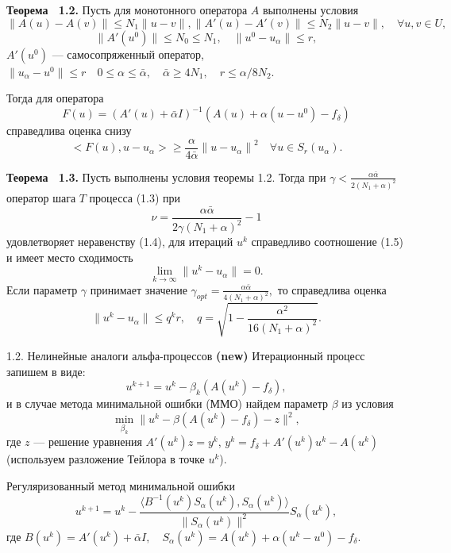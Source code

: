 \documentclass[10pt,pdf, mathserif, hyperref={unicode}]{beamer}
\begin{document}
\begin{frame}
	\begin{block}{\bf Теорема ~1.2.}
		Пусть для монотонного оператора $A$ выполнены условия $$
		\|A(u)-A(v)\|\le N_1\|u-v\|,
		\|A'(u)-A'(v)\|\le N_2\|u-v\|, \quad \forall u, v \in U,$$
		$$\|A'(u^0)\| \le N_0\le N_1, \quad \|u^0-u_\alpha\| \le r, $$
		\smallskip
		$A'(u^0)$ --- самосопряженный оператор, $\|u_\alpha-u^0\|\le r \quad  
		0\le\alpha\le\bar\alpha,\quad\bar\alpha\ge 4N_1,\quad r\le\alpha/8N_2.$
		\vspace{3mm}
		
		Тогда для оператора
		$$ F(u)=(A'(u)+\bar\alpha I)^{-1}(A(u)+\alpha(u-u^0)-f_\delta) $$
		справедлива оценка снизу
		$$<F(u), u-u_\alpha>\ge\frac{\alpha}{4\bar\alpha}{\|u-u_\alpha\|}^2 \quad \forall u \in S_r(u_\alpha).$$
	\end{block}
\end{frame} 
\begin{frame}
	\begin{block}{\bf Теорема ~1.3.}
		Пусть выполнены условия теоремы 1.2. Тогда при
		$\gamma<\frac{\alpha\bar\alpha}{2(N_1+\alpha)^2}$
		оператор шага $T$ процесса (1.3) при
		$$\nu=\frac{\alpha\bar\alpha}{2\gamma(N_1+\alpha)^2}-1$$
		удовлетворяет неравенству (1.4), для итераций $u^k$ справедливо соотношение (1.5) и имеет место сходимость
		$$\lim_{k\to\infty}\|u^k-u_\alpha\|=0.$$
		Если параметр $\gamma$ принимает значение ${\gamma}_{opt}=\frac{\alpha\bar\alpha}{4(N_1+\alpha)^2},$ то справедлива оценка $$\|u^k-u_\alpha\|\le q^k r, \quad q=\sqrt{1-\frac{{\alpha}^2}  {16(N_1+\alpha)^2}}.$$
	\end{block}
\end{frame}
\begin{frame}{1.2. Нелинейные аналоги альфа-процессов \textbf{(new)}}
	Итерационный процесс запишем в виде:
	$$u^{k+1}=u^k-\beta_k(A(u^k)-f_{\delta}),$$ и в случае метода минимальной ошибки (ММО) найдем параметр $\beta$ из условия
	$$\min_{\beta_k}{\|u^k-\beta(A(u^k)-f_{\delta})-z\|^2},$$ где $z$ --- решение уравнения $A'(u^k)z=y^k$, $y^k=f_{\delta}+A'(u^k)u^k-A(u^k)$ (используем разложение Тейлора в точке $u^k$).
	
	{\color{blue} Регуляризованный} метод минимальной ошибки
	$$u^{k+1} =u^k - \frac{\langle B^{-1}(u^k)S_\alpha(u^k), S_\alpha (u^k)\rangle}{\|S_\alpha(u^k)\|^2}S_\alpha(u^k),$$ где $B(u^k)=A'(u^k)+\bar{\alpha}I, \quad S_\alpha(u^k)=A(u^k)+\alpha(u^k-u^0)-f_\delta$.
\end{frame}
\end{document}
